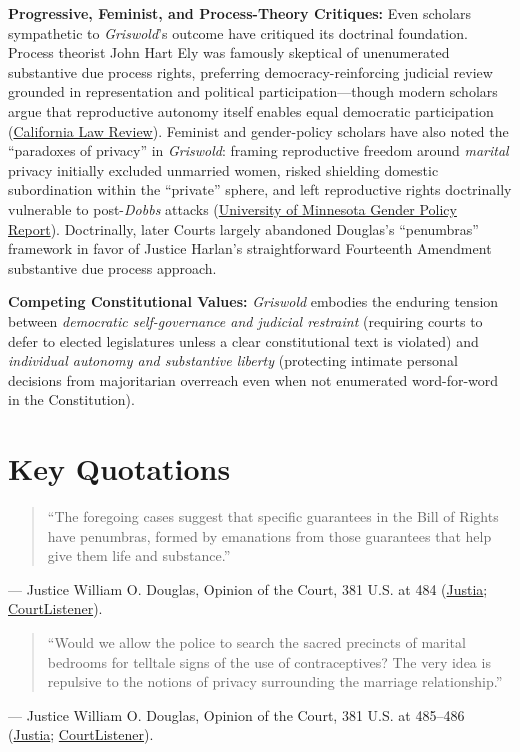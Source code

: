 \documentclass[12pt]{article}
\begin{document}
\textbf{Progressive, Feminist, and Process-Theory Critiques:} Even scholars sympathetic to \textit{Griswold}'s outcome have critiqued its doctrinal foundation. Process theorist John Hart Ely was famously skeptical of unenumerated substantive due process rights, preferring democracy-reinforcing judicial review grounded in representation and political participation---though modern scholars argue that reproductive autonomy itself enables equal democratic participation (\href{https://www.californialawreview.org/print/democracy-promoting-review}{California Law Review}). Feminist and gender-policy scholars have also noted the ``paradoxes of privacy'' in \textit{Griswold}: framing reproductive freedom around \textit{marital} privacy initially excluded unmarried women, risked shielding domestic subordination within the ``private'' sphere, and left reproductive rights doctrinally vulnerable to post-\textit{Dobbs} attacks (\href{https://genderpolicyreport.umn.edu/privacy-matters-the-legacy-of-griswold/}{University of Minnesota Gender Policy Report}). Doctrinally, later Courts largely abandoned Douglas's ``penumbras'' framework in favor of Justice Harlan's straightforward Fourteenth Amendment substantive due process approach.

\textbf{Competing Constitutional Values:} \textit{Griswold} embodies the enduring tension between \textit{democratic self-governance and judicial restraint} (requiring courts to defer to elected legislatures unless a clear constitutional text is violated) and \textit{individual autonomy and substantive liberty} (protecting intimate personal decisions from majoritarian overreach even when not enumerated word-for-word in the Constitution).

\section{Key Quotations}
\begin{quote}
``The foregoing cases suggest that specific guarantees in the Bill of Rights have penumbras, formed by emanations from those guarantees that help give them life and substance.''
\end{quote}
\noindent --- Justice William O. Douglas, Opinion of the Court, 381 U.S. at 484 (\href{https://supreme.justia.com/cases/federal/us/381/479/}{Justia}; \href{https://www.courtlistener.com/opinion/107082/griswold-v-connecticut/}{CourtListener}).

\begin{quote}
``Would we allow the police to search the sacred precincts of marital bedrooms for telltale signs of the use of contraceptives? The very idea is repulsive to the notions of privacy surrounding the marriage relationship.''
\end{quote}
\noindent --- Justice William O. Douglas, Opinion of the Court, 381 U.S. at 485--486 (\href{https://supreme.justia.com/cases/federal/us/381/479/}{Justia}; \href{https://www.courtlistener.com/opinion/107082/griswold-v-connecticut/}{CourtListener}).
\end{document}
